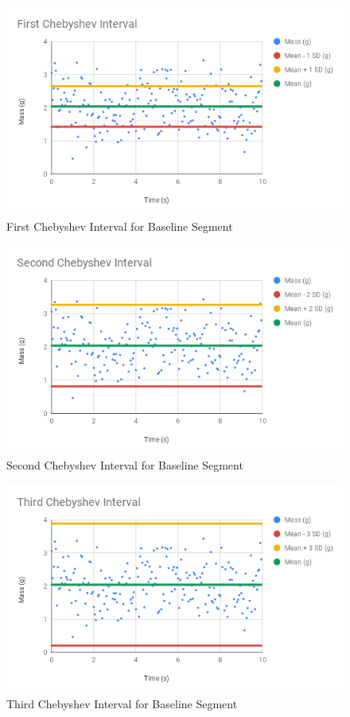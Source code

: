 \begin{figure} \label{figure.baseline.chebyshev.1}
    \centering
    \includegraphics[scale=0.71]{images/00-intro/baseline-chebyshev-1.png}
    \caption{First Chebyshev Interval for Baseline Segment}
\end{figure}
\begin{figure} \label{figure.baseline.chebyshev.2}
    \centering
    \includegraphics[scale=0.71]{images/00-intro/baseline-chebyshev-2.png}
    \caption{Second Chebyshev Interval for Baseline Segment}
\end{figure}
\begin{figure} \label{figure.baseline.chebyshev.3}
    \centering
    \includegraphics[scale=0.71]{images/00-intro/baseline-chebyshev-3.png}
    \caption{Third Chebyshev Interval for Baseline Segment}
\end{figure}
